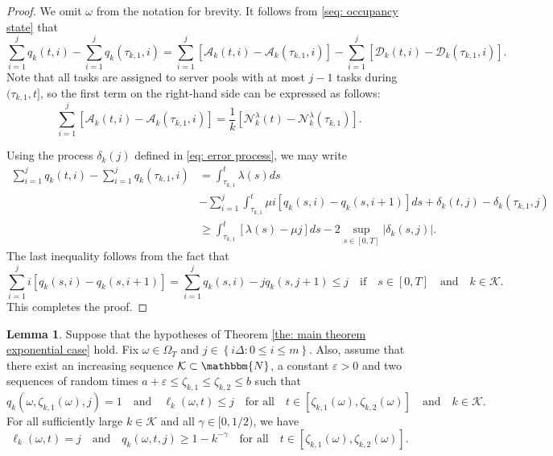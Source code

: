 \documentclass[a4paper, 12pt]{article}
\theoremstyle{definition}
\newtheorem{lemma}[theorem]{Lemma}
\newcommand{\set}[2]{\left\{#1 : #2\right\}}
\newcommand{\calA}{\mathcal{A}}
\newcommand{\calD}{\mathcal{D}}
\newcommand{\calK}{\mathcal{K}}
\newcommand{\calN}{\mathcal{N}}
\newcommand{\N}{\mathbbm{N}}
\begin{document}
\begin{proof}
We omit $\omega$ from the notation for brevity. It follows from \eqref{seq: occupancy state} that
\begin{equation*}
	\sum_{i = 1}^j q_k(t, i) - \sum_{i = 1}^j q_k\left(\tau_{k, 1}, i\right) = \sum_{i = 1}^j \left[\calA_k(t, i) - \calA_k\left(\tau_{k, 1}, i\right)\right] - \sum_{i = 1}^j \left[\calD_k(t, i) - \calD_k\left(\tau_{k, 1}, i\right)\right].
\end{equation*}
Note that all tasks are assigned to server pools with at most $j - 1$ tasks during $(\tau_{k, 1}, t]$, so the first term on the right-hand side can be expressed as follows:
\begin{equation*}
	\sum_{i = 1}^j \left[\calA_k(t, i) - \calA_k\left(\tau_{k, 1}, i\right)\right] = \frac{1}{k}\left[\calN_k^\lambda(t) - \calN_k^\lambda\left(\tau_{k, 1}\right)\right].
\end{equation*}

Using the process $\delta_k(j)$ defined in \eqref{eq: error process}, we may write
\begin{align*}
	\sum_{i = 1}^j q_k(t, i) - \sum_{i = 1}^j q_k\left(\tau_{k, 1}, i\right) &= \int_{\tau_{k, 1}}^t \lambda(s)ds \\
	&- \sum_{i = 1}^j \int_{\tau_{k, 1}}^t \mu i \left[q_k(s, i) - q_k(s, i + 1)\right]ds + \delta_k(t, j) - \delta_k(\tau_{k, 1}, j) \\
	&\geq \int_{\tau_{k, 1}}^t \left[\lambda(s) - \mu j\right]ds - 2\sup_{s \in [0, T]} \left|\delta_k(s, j)\right|.
\end{align*}
The last inequality follows from the fact that
\begin{equation*}
	\sum_{i = 1}^j i\left[q_k(s, i) - q_k(s, i + 1)\right] = \sum_{i = 1}^j q_k(s, i) - jq_k(s, j + 1) \leq j \quad \text{if} \quad s \in [0, T] \quad \text{and} \quad k \in \calK.
\end{equation*}
This completes the proof.
%
\end{proof}

\begin{lemma}
	\label{lem: lemma 2 for main result}
	Suppose that the hypotheses of Theorem \ref{the: main theorem exponential case} hold. Fix $\omega \in \Omega_T$ and $j \in \set{i\Delta}{0 \leq i \leq m}$. Also, assume that there exist an increasing sequence $\calK \subset \N$, a constant $\varepsilon > 0$ and two sequences of random times $a + \varepsilon \leq \zeta_{k, 1} \leq \zeta_{k, 2} \leq b$ such that
	\begin{equation*}
		q_k\left(\omega, \zeta_{k, 1}(\omega), j\right) = 1 \quad \text{and} \quad \ell_k(\omega, t) \leq j \quad \text{for all} \quad t \in \left[\zeta_{k, 1}(\omega), \zeta_{k, 2}(\omega)\right] \quad \text{and} \quad k \in \calK.
	\end{equation*}
	For all sufficiently large $k \in \calK$ and all $\gamma \in [0, 1/2)$, we have
	\begin{equation*}
		\ell_k(\omega, t) = j \quad \text{and} \quad q_k(\omega, t, j) \geq 1 - k^{-\gamma} \quad \text{for all} \quad t \in \left[\zeta_{k, 1}(\omega), \zeta_{k, 2} (\omega)\right].
	\end{equation*}
\end{lemma}
\end{document}
